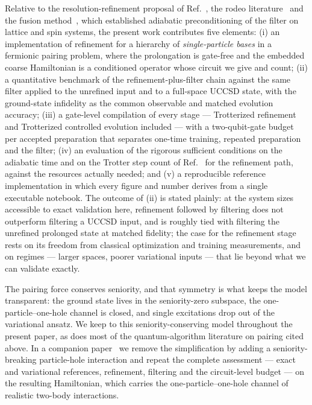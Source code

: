 \documentclass[
  aps,            %
  prc,            %
  reprint,        %
  superscriptaddress,
  floatfix,
  nofootinbib
]{revtex4-2}
\begin{document}
Relative to the resolution-refinement proposal of Ref.~\cite{Bogner2026}, the
rodeo literature~\cite{Choi2021,Qian2024} and the fusion
method~\cite{Patkowski2025fusion}, which established adiabatic preconditioning
of the filter on lattice and spin systems, the present work contributes five
elements: (i) an implementation of refinement for a hierarchy of
\emph{single-particle bases} in a fermionic pairing problem, where the
prolongation is gate-free and the embedded coarse Hamiltonian is a conditioned
operator whose circuit we give and count; (ii) a quantitative benchmark of the
refinement-plus-filter chain against the same filter applied to the unrefined
input and to a full-space UCCSD state, with the ground-state infidelity as the
common observable and matched evolution accuracy; (iii) a gate-level
compilation of every stage --- Trotterized refinement and Trotterized
controlled evolution included --- with a two-qubit-gate budget per accepted
preparation that separates one-time training, repeated preparation and the
filter; (iv) an evaluation of the rigorous sufficient conditions on the
adiabatic time and on the Trotter step count of Ref.~\cite{Sadia2026} for the
refinement path, against the resources actually needed; and (v) a reproducible
reference implementation in which every figure and number derives from a
single executable notebook.  The outcome of (ii) is stated plainly: at the
system sizes accessible to exact validation here, refinement followed by
filtering does not outperform filtering a UCCSD input, and is roughly tied
with filtering the unrefined prolonged state at matched fidelity; the case
for the refinement stage rests on its freedom from classical optimization and
training measurements, and on regimes --- larger spaces, poorer variational
inputs --- that lie beyond what we can validate exactly.

The pairing force conserves seniority, and that symmetry is what keeps the
model transparent: the ground state lives in the seniority-zero subspace, the
one-particle--one-hole channel is closed, and single excitations drop out of
the variational ansatz.  We keep to this seniority-conserving model
throughout the present paper, as does most of the quantum-algorithm
literature on pairing cited above.  In a companion paper~\cite{PHcompanion}
we remove the simplification by adding a seniority-breaking particle-hole
interaction and repeat the complete assessment --- exact and variational
references, refinement, filtering and the circuit-level budget --- on the
resulting Hamiltonian, which carries the one-particle--one-hole channel of
realistic two-body interactions.
\end{document}
